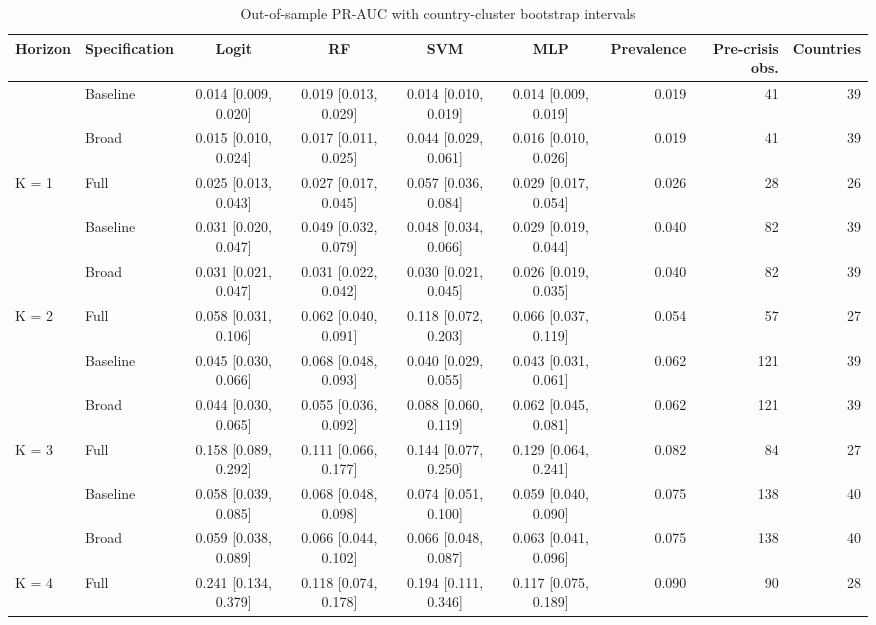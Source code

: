 \begin{table}

\caption{\label{tab:pr_boot_main}Out-of-sample PR-AUC with country-cluster bootstrap intervals}
\centering
\begin{tabular}[t]{llccccrrr}
\toprule
Horizon & Specification & Logit & RF & SVM & MLP & Prevalence & Pre-crisis obs. & Countries\\
\midrule
 & Baseline & 0.014 [0.009, 0.020] & 0.019 [0.013, 0.029] & 0.014 [0.010, 0.019] & 0.014 [0.009, 0.019] & 0.019 & 41 & 39\\

 & Broad & 0.015 [0.010, 0.024] & 0.017 [0.011, 0.025] & 0.044 [0.029, 0.061] & 0.016 [0.010, 0.026] & 0.019 & 41 & 39\\

\multirow[t]{-2}{*}[\normalbaselineskip]{\raggedright\arraybackslash K = 1} & Full & 0.025 [0.013, 0.043] & 0.027 [0.017, 0.045] & 0.057 [0.036, 0.084] & 0.029 [0.017, 0.054] & 0.026 & 28 & 26\\
\cmidrule{1-9}
 & Baseline & 0.031 [0.020, 0.047] & 0.049 [0.032, 0.079] & 0.048 [0.034, 0.066] & 0.029 [0.019, 0.044] & 0.040 & 82 & 39\\

 & Broad & 0.031 [0.021, 0.047] & 0.031 [0.022, 0.042] & 0.030 [0.021, 0.045] & 0.026 [0.019, 0.035] & 0.040 & 82 & 39\\

\multirow[t]{-2}{*}[\normalbaselineskip]{\raggedright\arraybackslash K = 2} & Full & 0.058 [0.031, 0.106] & 0.062 [0.040, 0.091] & 0.118 [0.072, 0.203] & 0.066 [0.037, 0.119] & 0.054 & 57 & 27\\
\cmidrule{1-9}
 & Baseline & 0.045 [0.030, 0.066] & 0.068 [0.048, 0.093] & 0.040 [0.029, 0.055] & 0.043 [0.031, 0.061] & 0.062 & 121 & 39\\

 & Broad & 0.044 [0.030, 0.065] & 0.055 [0.036, 0.092] & 0.088 [0.060, 0.119] & 0.062 [0.045, 0.081] & 0.062 & 121 & 39\\

\multirow[t]{-2}{*}[\normalbaselineskip]{\raggedright\arraybackslash K = 3} & Full & 0.158 [0.089, 0.292] & 0.111 [0.066, 0.177] & 0.144 [0.077, 0.250] & 0.129 [0.064, 0.241] & 0.082 & 84 & 27\\
\cmidrule{1-9}
 & Baseline & 0.058 [0.039, 0.085] & 0.068 [0.048, 0.098] & 0.074 [0.051, 0.100] & 0.059 [0.040, 0.090] & 0.075 & 138 & 40\\

 & Broad & 0.059 [0.038, 0.089] & 0.066 [0.044, 0.102] & 0.066 [0.048, 0.087] & 0.063 [0.041, 0.096] & 0.075 & 138 & 40\\

\multirow[t]{-2}{*}[\normalbaselineskip]{\raggedright\arraybackslash K = 4} & Full & 0.241 [0.134, 0.379] & 0.118 [0.074, 0.178] & 0.194 [0.111, 0.346] & 0.117 [0.075, 0.189] & 0.090 & 90 & 28\\
\bottomrule
\end{tabular}
\end{table}
